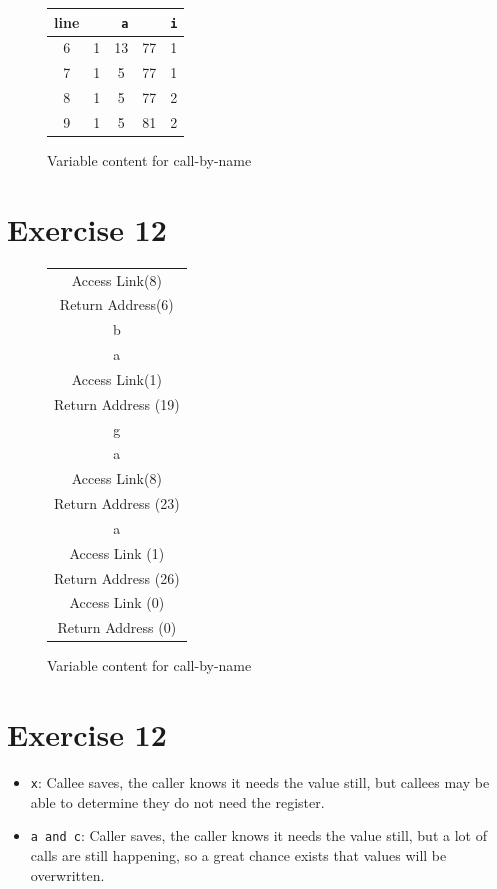 \documentclass[11pt]{article} %
\begin{document}
\begin{figure}[H]
\centering
\begin{tabular}{ccccc}
line & \multicolumn{3}{c}{\texttt{a}} & \texttt{i} \\ 
\hline 
6 & 1 & 13 & 77 & 1 \\ 
7 & 1 & 5 & 77 & 1 \\ 
8 & 1 & 5 & 77 & 2 \\ 
9 & 1 & 5 & 81 & 2 \\ 
\hline 
\end{tabular} 
\caption{Variable content for call-by-name}
\end{figure}

\section*{Exercise 12}
\begin{figure}[H]
\centering
\begin{tabular}{|c|}
\hline 
Access Link(8) \\ 
Return Address(6) \\ 
b \\ 
\hline 
a \\ 
Access Link(1) \\ 
Return Address (19) \\ 
g \\ 
\hline 
a \\ 
Access Link(8) \\ 
Return Address (23) \\
\hline
a \\ 
Access Link (1) \\ 
Return Address (26) \\ 
\hline
Access Link (0) \\ 
Return Address (0) \\ 
\hline 
\end{tabular} 
\caption{Variable content for call-by-name}
\end{figure}

\section*{Exercise 12}

\begin{itemize}
\item \texttt{x}: Callee saves, the caller knows it needs the value still, but callees may be able to determine they do not need the register.
\item \texttt{a and c}: Caller saves, the caller knows it needs the value still, but a lot of calls are still happening, so a great chance exists that values will be overwritten.
\end{itemize}
\end{document}
